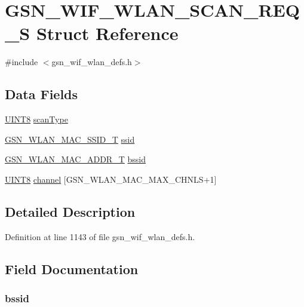 \hypertarget{a00402}{
\section{GSN\_\-WIF\_\-WLAN\_\-SCAN\_\-REQ\_\-S Struct Reference}
\label{a00402}
}


{\ttfamily \#include $<$gsn\_\-wif\_\-wlan\_\-defs.h$>$}

\subsection*{Data Fields}
\begin{DoxyCompactItemize}
\item 
\hyperlink{a00660_gab27e9918b538ce9d8ca692479b375b6a}{UINT8} \hyperlink{a00402_a000a5568cb4c2c12ad873696b2d6f83e}{scanType}
\item 
\hyperlink{a00417}{GSN\_\-WLAN\_\-MAC\_\-SSID\_\-T} \hyperlink{a00402_a9bcb2e5a0dbdd5461faec24950cf7459}{ssid}
\item 
\hyperlink{a00416}{GSN\_\-WLAN\_\-MAC\_\-ADDR\_\-T} \hyperlink{a00402_a1d70c2c8895c2763bdede85266c38318}{bssid}
\item 
\hyperlink{a00660_gab27e9918b538ce9d8ca692479b375b6a}{UINT8} \hyperlink{a00402_aaee6d90a2e587462e944c0ab1d4f8151}{channel} \mbox{[}GSN\_\-WLAN\_\-MAC\_\-MAX\_\-CHNLS+1\mbox{]}
\end{DoxyCompactItemize}


\subsection{Detailed Description}


Definition at line 1143 of file gsn\_\-wif\_\-wlan\_\-defs.h.



\subsection{Field Documentation}
\hypertarget{a00402_a1d70c2c8895c2763bdede85266c38318}{
\subsubsection[{bssid}]{ {\bf bssid}}}
\label{a00402_a1d70c2c8895c2763bdede85266c38318}


